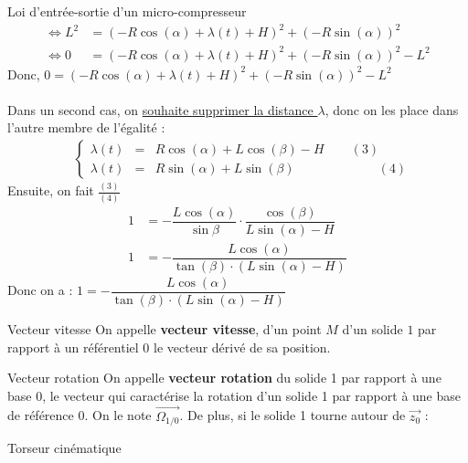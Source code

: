 \documentclass{article} %
\begin{document}
{\begin{exemple}{Loi d'entrée-sortie d'un micro-compresseur}
\begin{align*}
\Leftrightarrow L^2&= \left(-R\cos(\alpha) + \lambda(t) + H\right)^2+\left(-R\sin(\alpha)\right)^2 \\
\Leftrightarrow 0&= \left(-R\cos(\alpha) + \lambda(t) + H\right)^2+\left(-R\sin(\alpha)\right)^2-L^2
\end{align*}
Donc, $\boxed{0= \left(-R\cos(\alpha) + \lambda(t) + H\right)^2+\left(-R\sin(\alpha)\right)^2-L^2}$\\\\
Dans un second cas, on \underline{souhaite supprimer la distance $\lambda$}, donc on les place dans l'autre membre de l'égalité :
\begin{align*}
 &\left\{
 \begin{array}{rcl}
 \lambda(t)&=& R\cos(\alpha)+ L\cos(\beta) - H  \hspace{25pt}(3) \\
 \lambda(t)&=& R\sin(\alpha)+ L\sin(\beta)\hspace{78pt}(4)
 \end{array}
 \right.
\end{align*}
Ensuite, on fait $\frac{(3)}{(4)}$
\begin{align*}
1&=-\dfrac{L\cos(\alpha)}{\sin\beta}\cdot\dfrac{\cos(\beta)}{L\sin(\alpha)-H}\\
1&=-\dfrac{L\cos(\alpha)}{\tan(\beta)\cdot(L\sin(\alpha)-H)}
\end{align*}
Donc on a : $\boxed{1=-\dfrac{L\cos(\alpha)}{\tan(\beta)\cdot(L\sin(\alpha)-H)}}$
\end{exemple}
\pagebreak
{}
{}
\begin{definition}{Vecteur vitesse}
On appelle \textbf{vecteur vitesse}, d'un point $M$ d'un solide $1$ par rapport à un référentiel $0$ le vecteur dérivé de sa position.
\end{definition}
\begin{definition}{Vecteur rotation}
On appelle \textbf{vecteur rotation} du solide 1 par rapport à une base 0, le vecteur qui caractérise la rotation d'un solide 1 par rapport à une base de référence 0. On le note $\overrightarrow{\Omega_{1/0}}$.
De plus, si le solide 1 tourne autour de $\overrightarrow{z_0}$ :
\end{definition}
\begin{definition}{Torseur cinématique}

\end{definition}}
\end{document}
